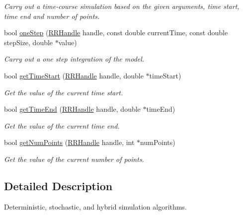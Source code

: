 \begin{DoxyCompactItemize}
\begin{DoxyCompactList}\small\item\em Carry out a time-\/course simulation based on the given arguments, time start, time end and number of points. \end{DoxyCompactList}\item 
bool \hyperlink{group__simulation_ga64cec7cbfbac4e4a11dcda4cc6eb2b9e}{one\+Step} (\hyperlink{rrc__types_8h_a1d68f0592372208fa5a5f2799ea4b3ae}{R\+R\+Handle} handle, const double current\+Time, const double step\+Size, double $\ast$value)
\begin{DoxyCompactList}\small\item\em Carry out a one step integration of the model. \end{DoxyCompactList}\item 
bool \hyperlink{group__simulation_gaf302d02e9f0d57dd05995a7a211e5236}{get\+Time\+Start} (\hyperlink{rrc__types_8h_a1d68f0592372208fa5a5f2799ea4b3ae}{R\+R\+Handle} handle, double $\ast$time\+Start)
\begin{DoxyCompactList}\small\item\em Get the value of the current time start. \end{DoxyCompactList}\item 
bool \hyperlink{group__simulation_ga1130df59dce620b619e3e58874025e57}{get\+Time\+End} (\hyperlink{rrc__types_8h_a1d68f0592372208fa5a5f2799ea4b3ae}{R\+R\+Handle} handle, double $\ast$time\+End)
\begin{DoxyCompactList}\small\item\em Get the value of the current time end. \end{DoxyCompactList}\item 
bool \hyperlink{group__simulation_ga3e14da4bd986a908e4f6bcfc42c20717}{get\+Num\+Points} (\hyperlink{rrc__types_8h_a1d68f0592372208fa5a5f2799ea4b3ae}{R\+R\+Handle} handle, int $\ast$num\+Points)
\begin{DoxyCompactList}\small\item\em Get the value of the current number of points. \end{DoxyCompactList}\end{DoxyCompactItemize}


\subsection{Detailed Description}
Deterministic, stochastic, and hybrid simulation algorithms. 



